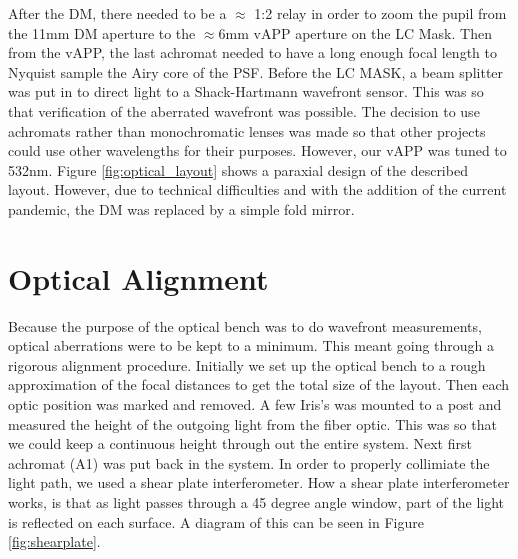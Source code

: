 After the DM, there needed to be a $\approx$ 1:2 relay in order to zoom the pupil from the 11mm DM aperture to the $\approx 6$mm vAPP aperture on the LC Mask.  Then from the vAPP, the last achromat needed to have a long enough focal length to Nyquist sample the Airy core of the PSF.  Before the LC MASK, a beam splitter was put in to direct light to a Shack-Hartmann wavefront sensor.  This was so that verification of the aberrated wavefront was possible.  The decision to use achromats rather than monochromatic lenses was made so that other projects could use other wavelengths for their purposes.  However, our vAPP was tuned to 532nm.  Figure \ref{fig:optical_layout} shows a paraxial design of the described layout.  However, due to technical difficulties and with the addition of the current pandemic, the DM was replaced by a simple fold mirror.


\section{Optical Alignment}

Because the purpose of the optical bench was to do wavefront measurements, optical aberrations were to be kept to a minimum.  This meant going through a rigorous alignment procedure.  Initially we set up the optical bench to a rough approximation of the focal distances to get the total size of the layout.  Then each optic position was marked and removed.  A few Iris's was mounted to a post and measured the height of the outgoing light from the fiber optic.  This was so that we could keep a continuous height through out the entire system.  Next first achromat (A1) was put back in the system.  In order to properly collimiate the light path, we used a shear plate interferometer.  How a shear plate interferometer works, is that as light passes through a 45 degree angle window, part of the light is reflected on each surface.  A diagram of this can be seen in Figure \ref{fig:shearplate}.


